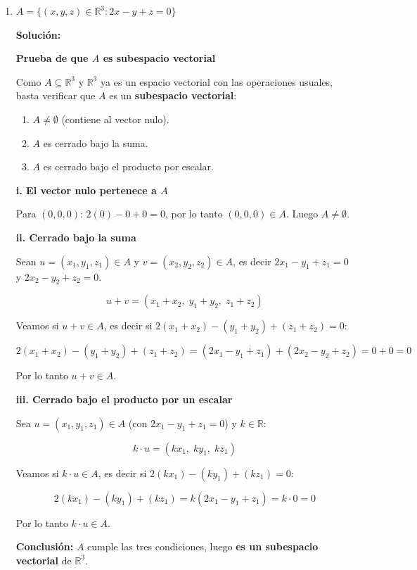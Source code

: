 \documentclass[12pt]{article}
\newcommand{\solucion}{%
    \vspace{0.8em}%
    \textbf{Solución:}%
    \vspace{0.8em}%
}
\begin{document}
\begin{enumerate}[label=\alph*.-]
    \item $A = \{(x,y,z) \in \mathbb{R}^3 : 2x - y + z = 0\}$

    \solucion

    \textbf{Prueba de que $A$ es subespacio vectorial}

    Como $A \subseteq \mathbb{R}^3$ y $\mathbb{R}^3$ ya es un espacio vectorial con las operaciones usuales, basta verificar que $A$ es un \textbf{subespacio vectorial}:

    \begin{enumerate}
        \item[i.] $A \neq \emptyset$ (contiene al vector nulo).
        \item[ii.] $A$ es cerrado bajo la suma.
        \item[iii.] $A$ es cerrado bajo el producto por escalar.
    \end{enumerate}

    \textbf{i. El vector nulo pertenece a $A$}

    Para $(0,0,0)$: $2(0)-0+0=0$, por lo tanto $(0,0,0) \in A$. Luego $A \neq \emptyset$.

    \textbf{ii. Cerrado bajo la suma}

    Sean $u=(x_1,y_1,z_1) \in A$ y $v=(x_2,y_2,z_2) \in A$, es decir $2x_1-y_1+z_1=0$ y $2x_2-y_2+z_2=0$.

    \[
    u+v = (x_1+x_2,\; y_1+y_2,\; z_1+z_2)
    \]

    Veamos si $u+v \in A$, es decir si $2(x_1+x_2)-(y_1+y_2)+(z_1+z_2)=0$:

    \[
    2(x_1+x_2)-(y_1+y_2)+(z_1+z_2) = (2x_1-y_1+z_1)+(2x_2-y_2+z_2) = 0+0 = 0
    \]

    Por lo tanto $u+v \in A$.

    \textbf{iii. Cerrado bajo el producto por un escalar}

    Sea $u=(x_1,y_1,z_1)\in A$ (con $2x_1-y_1+z_1=0$) y $k \in \mathbb{R}$:

    \[
    k\cdot u = (kx_1,\; ky_1,\; kz_1)
    \]

    Veamos si $k\cdot u \in A$, es decir si $2(kx_1)-(ky_1)+(kz_1)=0$:

    \[
    2(kx_1)-(ky_1)+(kz_1) = k(2x_1-y_1+z_1) = k\cdot 0 = 0
    \]

    Por lo tanto $k\cdot u \in A$.

    \textbf{Conclusión:} $A$ cumple las tres condiciones, luego \textbf{es un subespacio vectorial} de $\mathbb{R}^3$.


\end{enumerate}
\end{document}

